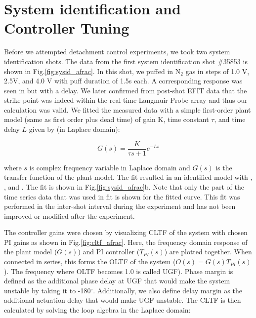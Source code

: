








\section{System identification and Controller Tuning}
\label{sec:sysid}







Before we attempted detachment control experiments, we took two system identification shots.
The data from the first system identification shot \#35853 is shown in Fig.\ref{fig:sysid_afrac}.
In this shot, we puffed in N$_2$ gas in steps of 1.0 V, 2.5V, and 4.0 V with puff duration of 1.5s each.
A corresponding response was seen in \Afrac but with a delay.
We later confirmed from post-shot EFIT data that the strike point was indeed within the real-time Langmuir Probe array and thus our \Afrac calculation was valid.
We fitted the measured data with a simple first-order plant model (same as first order plus dead time\cite{Eldon_2022_PPCF}) of gain K, time constant $\tau$, and time delay $L$ given by (in Laplace domain):

\begin{equation}
 G(s) = \frac{K}{\tau s + 1}e^{-L s}
\label{eq:sysid}
\end{equation}

where $s$ is complex frequency variable in Laplace domain and $G(s)$ is the transfer function of the plant model.
The fit resulted in an identified model with \AfracK, \AfracTau, and \AfracL.
The fit is shown in Fig.\ref{fig:sysid_afrac}b.
Note that only the part of the time series data that was used in fit is shown for the fitted curve.
This fit was performed in the inter-shot interval during the experiment and has not been improved or modified after the experiment.

The controller gains were chosen by visualizing \ac{CLTF} of the system with chosen PI gains as shown in Fig.\ref{fig:cltf_afrac}.
Here, the frequency domain response of the plant model ($G(s)$) and PI controller ($T_{PI}(s)$) are plotted together.
When connected in series, this forms the \ac{OLTF} of the system ($O(s) = G(s) T_{PI}(s)$).
The frequency where \ac{OLTF} becomes 1.0 is called \ac{UGF}).
Phase margin is defined as the additional phase delay at \ac{UGF} that would make the system unstable by taking it to -180$^\circ$.
Additionally, we also define delay margin as the additional actuation delay that would make \ac{UGF} unstable.
The \ac{CLTF} is then calculated by solving the loop algebra in the Laplace domain:

